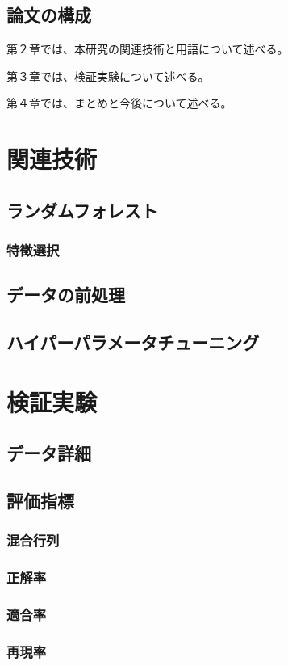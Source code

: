 \documentclass[platex]{suribt}
\begin{document}
\section{論文の構成}
第２章では、本研究の関連技術と用語について述べる。\par
第３章では、検証実験について述べる。\par
第４章では、まとめと今後について述べる。

\chapter{関連技術}
\section{ランダムフォレスト}
\subsection{特徴選択}
\section{データの前処理}
\section{ハイパーパラメータチューニング}

\chapter{検証実験}
\section{データ詳細}
\section{評価指標}
\subsection{混合行列}
\subsection{正解率}
\subsection{適合率}
\subsection{再現率}
\end{document}
